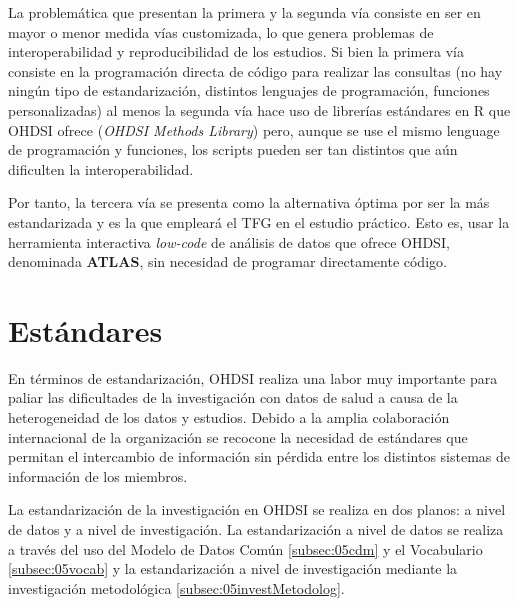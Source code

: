 La problemática que presentan la primera y la segunda vía consiste en ser en mayor o menor medida vías customizada, lo que genera problemas de interoperabilidad y reproducibilidad de los estudios. Si bien la primera vía consiste en la programación directa de código para realizar las consultas  (no hay ningún tipo de estandarización, distintos lenguajes de programación, funciones personalizadas) al menos la segunda vía hace uso de librerías estándares en R que OHDSI ofrece (\textit{OHDSI Methods Library}) pero, aunque se use el mismo lenguage de programación y funciones, los scripts pueden ser tan distintos que aún dificulten la interoperabilidad.

Por tanto, la tercera vía se presenta como la alternativa óptima por ser la más estandarizada y es la que empleará el TFG en el estudio práctico. Esto es, usar la herramienta interactiva \textit{low-code} de análisis de datos que ofrece OHDSI, denominada \textbf{ATLAS}, sin necesidad de programar directamente código.


\section{Estándares}\label{sec:05estandares}


En términos de estandarización, OHDSI realiza una labor muy importante para paliar las dificultades de la investigación con datos de salud a causa de la heterogeneidad de los datos y estudios. Debido a la amplia colaboración internacional de la organización se recocone la necesidad de estándares que permitan el intercambio de información sin pérdida entre los distintos sistemas de información de los miembros.

La estandarización de la investigación en OHDSI se realiza en dos planos: a nivel de datos y a nivel de investigación. La estandarización a nivel de datos se realiza a través del uso del Modelo de Datos Común \ref{subsec:05cdm} y el Vocabulario \ref{subsec:05vocab} y la estandarización a nivel de investigación mediante la investigación metodológica \ref{subsec:05investMetodolog}.

